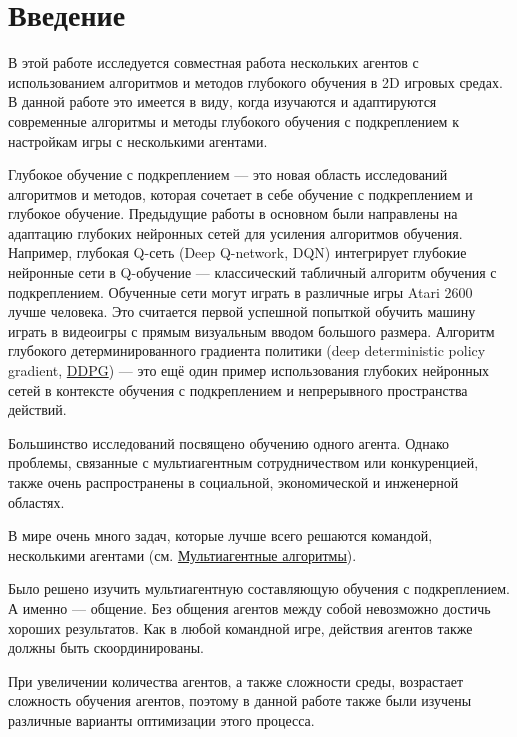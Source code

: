 \chapter*{Введение} \label{intro}%

В этой работе исследуется совместная работа нескольких агентов с использованием алгоритмов и методов глубокого обучения в 2D игровых средах. В данной работе это имеется в виду, когда изучаются и адаптируются современные алгоритмы и методы глубокого обучения с подкреплением к настройкам игры с несколькими агентами.

Глубокое обучение с подкреплением --- это новая область исследований алгоритмов и методов, которая сочетает в себе обучение с подкреплением и глубокое обучение. Предыдущие работы в основном были направлены на адаптацию глубоких нейронных сетей для усиления алгоритмов обучения. Например, глубокая Q-сеть (Deep Q-network, DQN) \cite{Mnih2015} интегрирует глубокие нейронные сети в Q-обучение --- классический табличный алгоритм обучения с подкреплением. Обученные сети могут играть в различные игры Atari 2600 \cite{Bellemare_2013} лучше человека. Это считается первой успешной попыткой обучить машину играть в видеоигры с прямым визуальным вводом большого размера. Алгоритм глубокого детерминированного градиента политики (deep deterministic policy gradient, \hyperref[acr:ddpg]{DDPG}) \cite{lillicrap2015continuous} --- это ещё один пример использования глубоких нейронных сетей в контексте обучения с подкреплением и непрерывного пространства действий.

Большинство исследований посвящено обучению одного агента. Однако проблемы, связанные с мультиагентным сотрудничеством или конкуренцией, также очень распространены в социальной, экономической и инженерной областях.

В мире очень много задач, которые лучше всего решаются командой, несколькими агентами (см. \hyperref[ch2:ma-algs]{Мультиагентные алгоритмы}).

Было решено изучить мультиагентную составляющую обучения с подкреплением. А именно --- общение. Без общения агентов между собой невозможно достичь хороших результатов. Как в любой командной игре, действия агентов также должны быть скоординированы.

При увеличении количества агентов, а также сложности среды, возрастает сложность обучения агентов, поэтому в данной работе также были изучены различные варианты оптимизации этого процесса.

